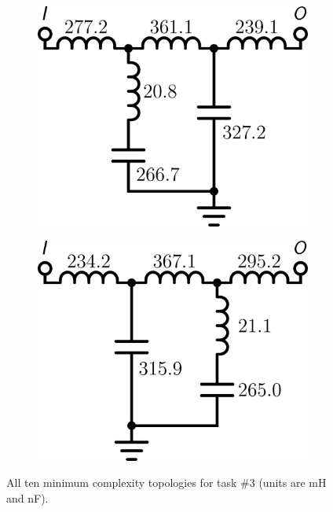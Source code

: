 \begin{figure}[h!]
\begin{subfigure}[t]{0.25\textwidth}
\centering
\includegraphics[scale = 0.14]{../app2/figures/(9)}
\caption{}
\end{subfigure}%
\begin{subfigure}[t]{0.25\textwidth}
\centering
\includegraphics[scale = 0.14]{../app2/figures/(10)}
\caption{}
\end{subfigure}%

\caption[All ten minimum complexity topologies for  task \#3.]{All ten minimum complexity topologies for  task \#3 (units are mH and nF).\label{fig:app2:lpf3}}

\end{figure}

